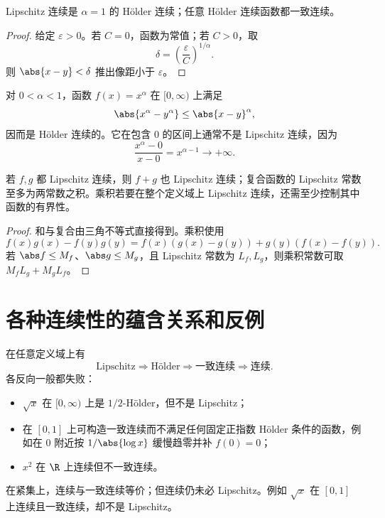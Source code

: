\begin{proposition}
Lipschitz 连续是 \(\alpha=1\) 的 Hölder 连续；任意 Hölder 连续函数都一致连续。
\end{proposition}

\begin{proof}
给定 \(\varepsilon>0\)。若 \(C=0\)，函数为常值；若 \(C>0\)，取
\[
 \delta=\left(\frac{\varepsilon}{C}\right)^{1/\alpha}.
\]
则 \(\abs{x-y}<\delta\) 推出像距小于 \(\varepsilon\)。
\end{proof}

\begin{example}
对 \(0<\alpha<1\)，函数 \(f(x)=x^\alpha\) 在 \([0,\infty)\) 上满足
\[
 \abs{x^\alpha-y^\alpha}\le\abs{x-y}^{\alpha},
\]
因而是 Hölder 连续的。它在包含 \(0\) 的区间上通常不是 Lipschitz 连续，因为
\[
 \frac{x^\alpha-0}{x-0}=x^{\alpha-1}\to+\infty.
\]
\end{example}

\begin{proposition}
若 \(f,g\) 都 Lipschitz 连续，则 \(f+g\) 也 Lipschitz 连续；复合函数的 Lipschitz 常数至多为两常数之积。乘积若要在整个定义域上 Lipschitz 连续，还需至少控制其中函数的有界性。
\end{proposition}

\begin{proof}
和与复合由三角不等式直接得到。乘积使用
\[
 f(x)g(x)-f(y)g(y)
 =f(x)(g(x)-g(y))+g(y)(f(x)-f(y)).
\]
若 \(\abs f\le M_f\)、\(\abs g\le M_g\)，且 Lipschitz 常数为 \(L_f,L_g\)，则乘积常数可取 \(M_fL_g+M_gL_f\)。
\end{proof}

\section{各种连续性的蕴含关系和反例}

在任意定义域上有
\[
 \text{Lipschitz}
 \Longrightarrow
 \text{Hölder}
 \Longrightarrow
 \text{一致连续}
 \Longrightarrow
 \text{连续}.
\]
各反向一般都失败：
\begin{itemize}
 \item \(\sqrt x\) 在 \([0,\infty)\) 上是 \(1/2\)-Hölder，但不是 Lipschitz；
 \item 在 \([0,1]\) 上可构造一致连续而不满足任何固定正指数 Hölder 条件的函数，例如在 \(0\) 附近按 \(1/\abs{\log x}\) 缓慢趋零并补 \(f(0)=0\)；
 \item \(x^2\) 在 \(\R\) 上连续但不一致连续。
\end{itemize}

在紧集上，连续与一致连续等价；但连续仍未必 Lipschitz。例如 \(\sqrt x\) 在 \([0,1]\) 上连续且一致连续，却不是 Lipschitz。

